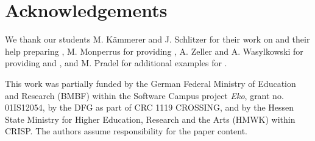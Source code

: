
\section*{Acknowledgements}

We thank
our students M. Kämmerer and J. Schlitzer for their work on \MUPipe and their help preparing \MUBench,
M. Monperrus for providing \DMMC,
A. Zeller and A. Wasylkowski for providing \Jadet and \Tikanga, and
M. Pradel for additional examples for \MUBench.

This work was partially funded by the German Federal Ministry of Education and Research (BMBF) within the Software Campus project \emph{Eko}, grant no. 01IS12054, by the DFG as part of CRC 1119 CROSSING, and by the Hessen State Ministry for Higher Education, Research and the Arts (HMWK) within CRISP. The authors assume responsibility for the paper content.
